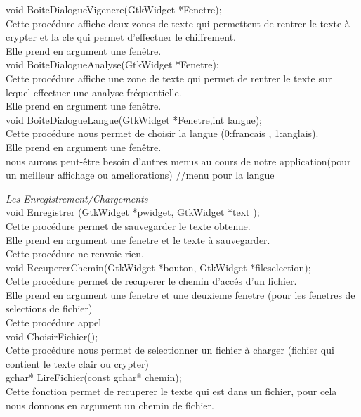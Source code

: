 \documentclass[a4]{article}
\begin{document}
	void BoiteDialogueVigenere(GtkWidget *Fenetre);\\
		Cette procédure affiche deux zones de texte qui permettent de rentrer le texte à crypter et la cle qui permet d'effectuer le chiffrement.\\
		Elle prend en argument une fenêtre.\\
		
	void BoiteDialogueAnalyse(GtkWidget *Fenetre);\\
		Cette procédure affiche une zone de texte qui permet de rentrer le texte sur lequel effectuer une analyse fréquentielle.\\
		Elle prend en argument une fenêtre.\\
		
	void BoiteDialogueLangue(GtkWidget *Fenetre,int langue);\\
		Cette procédure nous permet de choisir la langue (0:francais , 1:anglais).\\
		Elle prend en argument une fenêtre.\\
		
	nous aurons peut-être besoin d'autres menus au cours de notre application(pour un meilleur affichage ou ameliorations) 
	//menu pour la langue
	
	\textit{Les Enregistrement/Chargements}\\
	
	void Enregistrer (GtkWidget *pwidget, GtkWidget *text );\\
		Cette procédure permet de sauvegarder le texte obtenue.\\
		Elle prend en argument une fenetre et le texte à sauvegarder.\\
		Cette procédure ne renvoie rien.\\
	
	void RecupererChemin(GtkWidget *bouton, GtkWidget *fileselection);\\
		Cette procédure permet de recuperer le chemin d'accés d'un fichier.\\
		Elle prend en argument une fenetre et une deuxieme fenetre (pour les fenetres de selections de fichier)\\
		Cette procédure appel\\

	void ChoisirFichier();\\
		Cette procédure nous permet de selectionner un fichier à charger (fichier qui contient le texte clair ou 		crypter)\\

		
	gchar* LireFichier(const gchar* chemin);\\
		Cette fonction permet de recuperer le texte qui est dans un fichier, pour cela nous donnons en argument un chemin de fichier.\\
	
\end{document}
